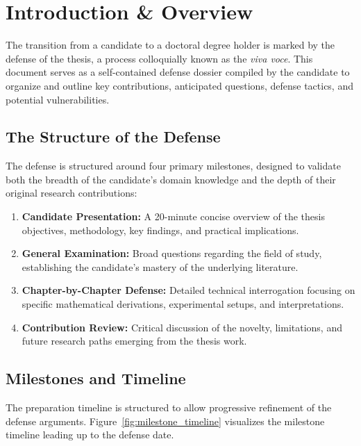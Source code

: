\chapter{Introduction \& Overview}
\label{ch:intro}

The transition from a candidate to a doctoral degree holder is marked by the defense of the thesis, a process colloquially known as the \emph{viva voce}. This document serves as a self-contained defense dossier compiled by the candidate to organize and outline key contributions, anticipated questions, defense tactics, and potential vulnerabilities.

\section{The Structure of the Defense}
The defense is structured around four primary milestones, designed to validate both the breadth of the candidate's domain knowledge and the depth of their original research contributions:
\begin{enumerate}
  \item \textbf{Candidate Presentation:} A 20-minute concise overview of the thesis objectives, methodology, key findings, and practical implications.
  \item \textbf{General Examination:} Broad questions regarding the field of study, establishing the candidate's mastery of the underlying literature.
  \item \textbf{Chapter-by-Chapter Defense:} Detailed technical interrogation focusing on specific mathematical derivations, experimental setups, and interpretations.
  \item \textbf{Contribution Review:} Critical discussion of the novelty, limitations, and future research paths emerging from the thesis work.
\end{enumerate}

\section{Milestones and Timeline}
The preparation timeline is structured to allow progressive refinement of the defense arguments. Figure~\ref{fig:milestone_timeline} visualizes the milestone timeline leading up to the defense date.

